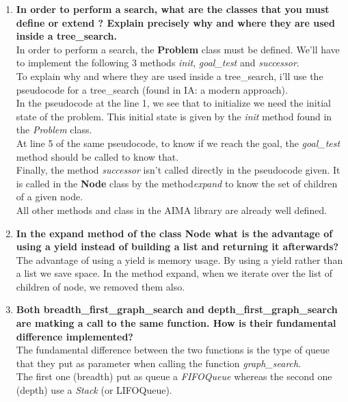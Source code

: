 \documentclass[10pt,a4paper]{article}
\begin{document}
\begin{enumerate}
	\item \textbf{In order to perform a search, what are the classes that you must define or extend ? Explain precisely why and where they are used inside a tree\_search.} \\
	
	In order to perform a search, the \textbf{Problem} class must be defined. We'll have to implement the following 3 methods  \textit{init}, \textit{goal\_test} and \textit{successor}. \\
	To explain why and where they are used inside a tree\_search, i'll use the pseudocode for a tree\_search (found in IA: a modern approach).\\
	In the pseudocode at the line 1, we see that to initialize we need the initial state of the problem. This initial state is given by the \textit{init} method found in the \textit{Problem} class.\\
	At line 5 of the same pseudocode, to know if we reach the goal, the \textit{goal\_test} method should be called to know that.\\
	Finally, the method \textit{successor} isn't called directly in the pseudocode given. It is called in the \textbf{Node} class by the method\textit{expand} to know the set of children of a given node.\\
	
	All other methods and class in the AIMA library are already well defined.
	\item \textbf{In the expand method of the class Node what is the advantage of using a yield instead of building a list and returning it afterwards?} \\
	
	The advantage of using a yield is memory usage. By using a yield rather than a list we save space. In the method expand, when we iterate over the list of children of node, we removed them also.
	
	\item \textbf{Both breadth\_first\_graph\_search and depth\_first\_graph\_search are matking a call to the same function. How is their fundamental difference implemented?} \\
	
	The fundamental difference between the two functions is the type of queue that they put as parameter when calling the function \textit{graph\_search}.\\
	The first one (breadth) put as queue a \textit{FIFOQueue} whereas the second one (depth) use a \textit{Stack} (or LIFOQueue).
	

\end{enumerate}
\end{document}
